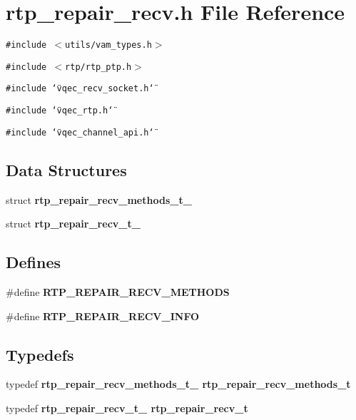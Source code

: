 \section{rtp\_\-repair\_\-recv.h File Reference}
\label{rtp__repair__recv_8h}
{\tt \#include $<$utils/vam\_\-types.h$>$}\par
{\tt \#include $<$rtp/rtp\_\-ptp.h$>$}\par
{\tt \#include \char`\"{}vqec\_\-recv\_\-socket.h\char`\"{}}\par
{\tt \#include \char`\"{}vqec\_\-rtp.h\char`\"{}}\par
{\tt \#include \char`\"{}vqec\_\-channel\_\-api.h\char`\"{}}\par
\subsection*{Data Structures}
\begin{CompactItemize}
\item 
struct \bf{rtp\_\-repair\_\-recv\_\-methods\_\-t\_\-}
\item 
struct \bf{rtp\_\-repair\_\-recv\_\-t\_\-}
\end{CompactItemize}
\subsection*{Defines}
\begin{CompactItemize}
\item 
\#define \bf{RTP\_\-REPAIR\_\-RECV\_\-METHODS}
\item 
\#define \bf{RTP\_\-REPAIR\_\-RECV\_\-INFO}
\end{CompactItemize}
\subsection*{Typedefs}
\begin{CompactItemize}
\item 
typedef \bf{rtp\_\-repair\_\-recv\_\-methods\_\-t\_\-} \bf{rtp\_\-repair\_\-recv\_\-methods\_\-t}
\item 
typedef \bf{rtp\_\-repair\_\-recv\_\-t\_\-} \bf{rtp\_\-repair\_\-recv\_\-t}
\end{CompactItemize}
